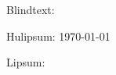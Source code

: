 \documentclass{article}
\begin{document}
\frenchspacing
{}
Blindtext:
\blindtext

Hulipsum:
\today\raggedleft{\hulipsum[1]}

Lipsum:
\linespread{1.6}\selectfont{{\lipsum[1]}}
\end{document}
